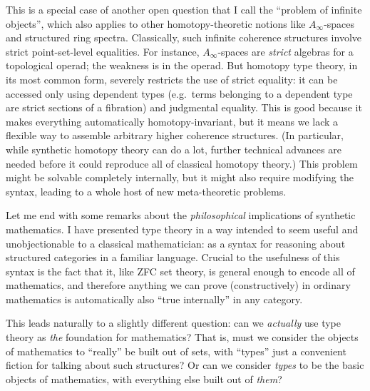 \documentclass[12pt]{article}
\def\oo{\ensuremath{\infty}}
\def\io{\ensuremath{(\oo,1)}}
\numberwithin{equation}{section}
\begin{document}
This is a special case of another open question that I call the ``problem of infinite objects'', which also applies to other homotopy-theoretic notions like $A_\oo$-spaces and structured ring spectra.
Classically, such infinite coherence structures involve strict point-set-level equalities. %
For instance, $A_\oo$-spaces are \emph{strict} algebras for a topological operad; the weakness is in the operad.
But homotopy type theory, in its most common form, severely restricts the use of strict equality: it can be accessed only using dependent types (e.g.\ terms belonging to a dependent type are strict sections of a fibration) and judgmental equality.
This is good because it makes everything automatically homotopy-invariant, but it means we lack a flexible way to assemble arbitrary higher coherence structures.
(In particular, while synthetic homotopy theory can do a lot, further technical advances are needed before it could reproduce all of classical homotopy theory.)
This problem might be solvable completely internally, but it might also require modifying the syntax, leading to a whole host of new meta-theoretic problems.


Let me end with some remarks about the \emph{philosophical} implications of synthetic mathematics.
I have presented type theory in a way intended to seem useful and unobjectionable to a classical mathematician: as a syntax for reasoning about structured categories in a familiar language.
Crucial to the usefulness of this syntax is the fact that it, like ZFC set theory, is general enough to encode all of mathematics, and therefore anything we can prove (constructively) in ordinary mathematics is automatically also ``true internally'' in any category.

This leads naturally to a slightly different question: can we \emph{actually} use type theory as \emph{the} foundation for mathematics?
That is, must we consider the objects of mathematics to ``really'' be built out of sets, with ``types'' just a convenient fiction for talking about such structures?
Or can we consider \emph{types} to be the basic objects of mathematics, with everything else built out of \emph{them}?
\end{document}
